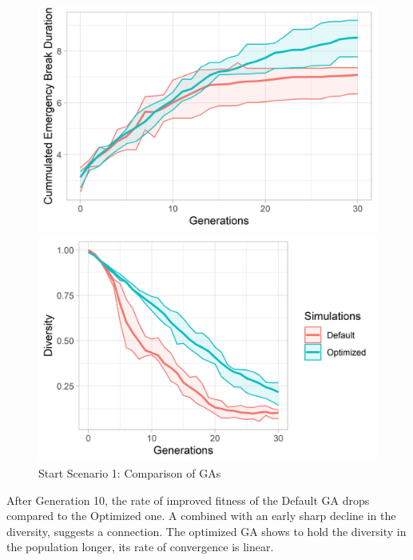 \begin{figure}[ht] 
	\label{figure:sim_1_ga_comparison}
	\begin{minipage}[b]{0.5\linewidth}
		\centering
		\includegraphics[width=1\linewidth]{simulations/evaluation/plots/sim_1_ga_generations} 
	\end{minipage}%
	\begin{minipage}[b]{0.5\linewidth}
		\centering
		\includegraphics[width=1\linewidth]{simulations/evaluation/plots/sim_1_ga_diversity} 
	\end{minipage} 
	\caption{Start Scenario 1: Comparison of GAs}
\end{figure}

After Generation 10, the rate of improved fitness of the Default GA drops compared to the Optimized one. A combined with an early sharp decline in the diversity, suggests a connection. The optimized GA shows to hold the diversity in the population longer, its rate of convergence is linear.

